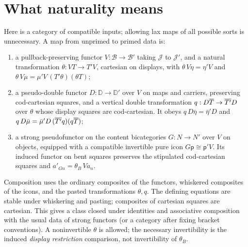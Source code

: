 \documentclass[11pt]{article}
\theoremstyle{definition}\newtheorem{definition}[theorem]{Definition}
\newcommand{\B}{\mathcal B}\newcommand{\J}{\mathcal J}
\newcommand{\D}{\mathbb D}\newcommand{\N}{\mathbb N}
\newcommand{\pure}{\mathsf{p}}\newcommand{\grade}{\mathsf G}
\begin{document}
\section{What naturality means}\label{sec:maps}
Here is a category of compatible inputs; allowing lax maps of all
possible sorts is unnecessary. A map from unprimed to primed data is:
\begin{enumerate}
\item a pullback-preserving functor $V:\B\to\B'$ taking $\J$ to $\J'$,
and a natural transformation $\theta:VT\to T'V$, cartesian on
displays, with
$\theta\,V\eta=\eta'V$ and
$\theta\,V\mu=\mu'V\,(T'\theta)(\theta T)$;
\item a pseudo-double functor $D:\D\to\D'$ over $V$ on maps and
carriers, preserving cod-cartesian squares, and a vertical double
transformation $q:D\overline T\to\overline{T'}D$ over $\theta$ whose
display squares are cod-cartesian. It obeys
$q\,D\bar\eta=\bar\eta'D$ and
$q\,D\bar\mu=\bar\mu'D\,(\overline{T'}q)(q\overline T)$;
\item a strong pseudofunctor on the content bicategories $G:N\to N'$
over $V$ on objects, equipped with a compatible invertible pure icon
$G\pure\cong\pure' V$. Its induced functor on bent squares preserves
the stipulated cod-cartesian squares and
$a'_{Gn}=\theta_B\,V a_n$.
\end{enumerate}
Composition uses the ordinary composites of the functors, whiskered
composites of the icons, and the pasted transformations $\theta,q$.
The defining equations are stable under whiskering and pasting;
composites of cartesian squares are cartesian. This gives a class
closed under identities and associative composition with the usual
data of strong functors (or a category after fixing bracket conventions).
A noninvertible $\theta$ is allowed; the necessary invertibility is
the induced \emph{display restriction} comparison, not invertibility
of $\theta_B$.
\end{document}
